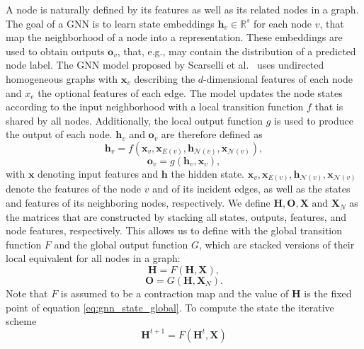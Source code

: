 A node is naturally defined by its features as well as its related nodes in a graph. The goal of a GNN is to learn state embeddings $\mathbf{h}_v \in \mathbb{R}^s$ for each node $v$, that map the neighborhood of a node into a representation. These embeddings are used to obtain outputs $\mathbf{o}_v$, that, e.g., may contain the distribution of a predicted node label. The GNN model proposed by Scarselli et al.~\cite{4700287} uses undirected homogeneous graphs with $\mathbf{x}_v$ describing the $d$-dimensional features of each node and $x_e$ the optional features of each edge. The model updates the node states according to the input neighborhood with a local transition function $f$ that is shared by all nodes. Additionally, the local output function $g$ is used to produce the output of each node. $\mathbf{h}_v$ and $\mathbf{o}_v$ are therefore defined as
\begin{equation}
    \mathbf{h}_v = f(\mathbf{x}_v, \mathbf{x}_{E(v)}, \mathbf{h}_{\mathcal{N}(v)}, \mathbf{x}_{\mathcal{N}(v)}),
    \label{eq:gnn_state_local}
\end{equation}
\begin{equation}
    \mathbf{o}_v = g(\mathbf{h}_v, \mathbf{x}_v),
\end{equation}
with $\mathbf{x}$ denoting input features and $\mathbf{h}$ the hidden state. $\mathbf{x}_v, \mathbf{x}_{E(v)}, \mathbf{h}_{\mathcal{N}(v)}, \mathbf{x}_{\mathcal{N}(v)}$ denote the features of the node $v$ and of its incident edges, as well as the states and features of its neighboring nodes, respectively. We define $\mathbf{H}, \mathbf{O}, \mathbf{X} \text{ and  }\mathbf{X}_N$ as the matrices that are constructed by stacking all states, outputs, features, and node features, respectively. This allows us to define with the global transition function $F$ and the global output function $G$, which are stacked versions of their local equivalent for all nodes in a graph: 
\begin{equation}
    \mathbf{H} = F(\mathbf{H}, \mathbf{X}),
    \label{eq:gnn_state_global}
\end{equation}
\begin{equation}
    \mathbf{O} = G(\mathbf{H},\mathbf{X}_N).
\end{equation}
Note that $F$ is assumed to be a contraction map and the value of $\mathbf{H}$ is the fixed point of equation \eqref{eq:gnn_state_global}. To compute the state the iterative scheme
\begin{equation}
    \label{eq:GNN_iterations}
    \mathbf{H}^{t+1} = F(\mathbf{H}^{t}, \mathbf{X})
\end{equation}
